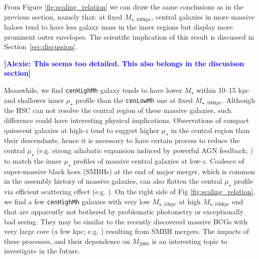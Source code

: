 \documentclass[a4paper,fleqn,usenatbib]{mnras}
\def\rbcg{\texttt{cenHighMh}}
\def\nbcg{\texttt{cenLowMh}}
\def\mstar{{$M_{\star}$}}
\def\mhalo{{$M_{\mathrm{200b}}$}}
\def\minn{{$M_{\star,10\mathrm{kpc}}$}}
\def\mtot{{$M_{\star,100\mathrm{kpc}}$}}
\def\mden{{$\mu_{\star}$}}
\newcommand{\alexie}[1]{\textcolor{blue}{\textbf{[Alexie: #1]}}}
\begin{document}
    From Figure \ref{fig:scaling_relation} we can draw the same conclusions as in the previous section, namely that: at fixed \mtot{}, central galaxies in more massive haloes tend to have less galaxy mass in the inner regions but display more prominent outer envelopes. The scientific implication of this result is discussed in 
    Section~\ref{sec:discussion}.

\alexie{This seems too detailed. This also belongs in the discusison section}

    Meanwhile, we find \rbcg{} galaxy tends to have lower \mstar{} within 10--15 kpc 
    and shallower inner \mden{} profile than the \nbcg{} one at fixed \mtot{}. 
    Although the HSC can not resolve the central region of these massive galaxies, 
    such difference could have interesting physical implications. 
    Observations of compact quiescent galaxies at high-$z$ tend to suggest higher 
    \mden{} in the central region than their descendants, hence it is necessary to 
    have certain process to reduce the central \mden{} (e.g. strong adiabatic expansion 
    induced by powerful AGN feedback; \citealt{Fan2008}) to match the inner \mden{} 
    profiles of massive central galaxies at low-$z$.
    Coalesce of super-massive black hoes (SMBHs) at the end of major merger, which is 
    common in the assembly history of massive galaxies, can also flatten the central 
    \mden{} profile via efficient scattering effect (e.g. \citealt{Milosavljevi2002}).
    On the right side of Fig \ref{fig:scaling_relation}, we find a few \rbcg{} galaxies 
    with very low \minn{} at high \mtot{} end that are apparently not bothered by 
    problematic photometry or exceptionally bad seeing.  
    They may be similar to the recently discovered massive BCGs with very large core 
    (a few kpc; e.g. \citealt{Postman2012, LopezCruz2014}) resulting from SMBH mergers.
    The impacts of these processes, and their dependence on \mhalo{} is an interesting 
    topic to investigate in the future.
\end{document}
